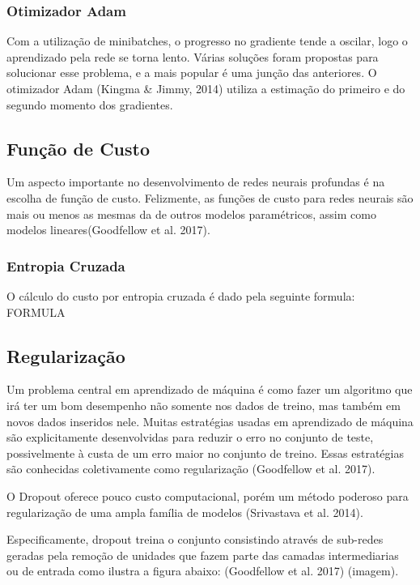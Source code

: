 \documentclass[12pt]{article}
\begin{document}
\subsubsection{Otimizador Adam}

Com a utilização de minibatches, o progresso no gradiente tende a oscilar, logo o aprendizado pela rede se torna lento. Várias soluções foram propostas para solucionar esse problema, e a mais popular é uma junção das anteriores. O otimizador Adam (Kingma & Jimmy, 2014) utiliza a estimação do primeiro e do segundo momento dos gradientes.

\subsection{Função de Custo}

Um aspecto importante no desenvolvimento de redes neurais profundas é na escolha de função de custo. Felizmente, as funções de custo para redes neurais são mais ou menos as mesmas da de outros modelos paramétricos, assim como modelos lineares(Goodfellow et al. 2017).

\subsubsection{Entropia Cruzada}

O cálculo do custo por entropia cruzada é dado pela seguinte formula: FORMULA

\subsection{Regularização}

Um problema central em aprendizado de máquina é como fazer um algoritmo que irá ter um bom desempenho não somente nos dados de treino, mas também em novos dados inseridos nele. Muitas estratégias usadas em aprendizado de máquina são explicitamente desenvolvidas para reduzir o erro no conjunto de teste, possivelmente à custa de um erro maior no conjunto de treino. Essas estratégias são conhecidas coletivamente como regularização (Goodfellow et al. 2017).

O Dropout oferece pouco custo computacional, porém um método poderoso para regularização de uma ampla família de modelos (Srivastava et al. 2014).

Especificamente, dropout treina o conjunto consistindo através de sub-redes geradas pela remoção de unidades que fazem parte das camadas intermediarias ou de entrada como ilustra a figura abaixo: (Goodfellow et al. 2017) (imagem).
\end{document}
